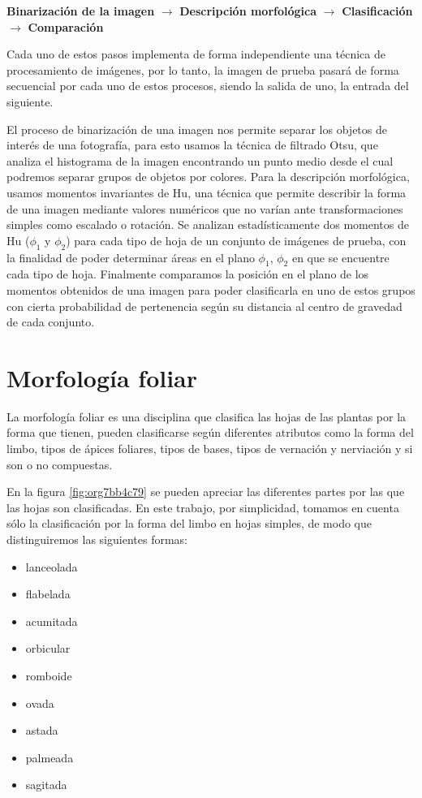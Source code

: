 \documentclass[letter]{article}
\begin{document}
\begin{center}
\textbf{Binarización de la imagen} \(\rightarrow\) \textbf{Descripción morfológica} \(\rightarrow\)
 \textbf{Clasificación} \(\rightarrow\) \textbf{Comparación}
\end{center}

Cada uno de estos pasos implementa de forma independiente una técnica de
procesamiento de imágenes, por lo tanto, la imagen de prueba pasará de forma
secuencial por cada uno de estos procesos, siendo la salida de uno, la entrada
del siguiente.

El proceso de binarización de una imagen nos permite separar los objetos de
interés de una fotografía, para esto usamos la técnica de filtrado Otsu, que
analiza el histograma de la imagen encontrando un punto medio desde el cual
podremos separar grupos de objetos por colores. Para la descripción morfológica,
usamos momentos invariantes de Hu, una técnica que permite describir la forma de
una imagen mediante valores numéricos que no varían ante transformaciones
simples como escalado o rotación. Se analizan estadísticamente dos momentos de
Hu (\(\phi_1\) y \(\phi_2\)) para cada tipo de hoja de un conjunto de imágenes de
prueba, con la finalidad de poder determinar áreas en el plano \(\phi_1\), \(\phi_2\)
en que se encuentre cada tipo de hoja. Finalmente comparamos la posición en el
plano de los momentos obtenidos de una imagen para poder clasificarla en uno de
estos grupos con cierta probabilidad de pertenencia según su distancia al
centro de gravedad de cada conjunto.

\section{Morfología foliar}
\label{sec:org9d4f2a1}
La morfología foliar es una disciplina que clasifica las hojas de las plantas
por la forma que tienen, pueden clasificarse según diferentes atributos como la
forma del limbo, tipos de ápices foliares, tipos de bases, tipos de vernación y
nerviación y si son o no compuestas.

En la figura \ref{fig:org7bb4c79} se pueden apreciar las diferentes partes por las que las
hojas son clasificadas. En este trabajo, por simplicidad, tomamos en cuenta sólo
la clasificación por la forma del limbo en hojas simples, de modo que
distinguiremos las siguientes formas:

\begin{itemize}
\item lanceolada
\item flabelada
\item acumitada
\item orbicular
\item romboide
\item ovada
\item astada
\item palmeada
\item sagitada
\end{itemize}
\end{document}
